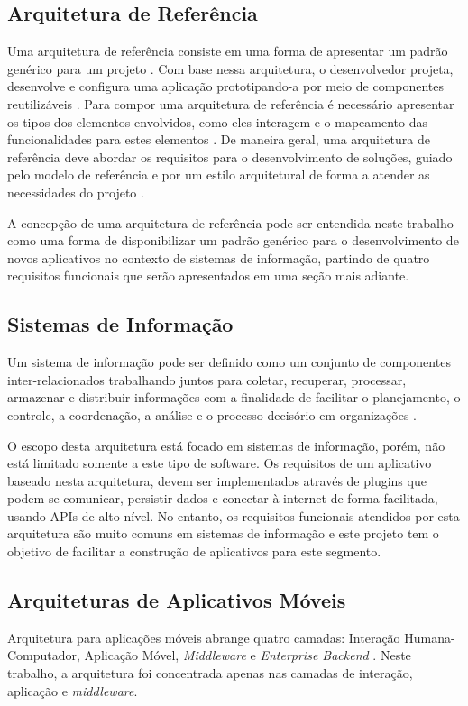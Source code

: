 \subsection{Arquitetura de Referência} %
Uma arquitetura de referência consiste em uma forma de apresentar um padrão genérico para um projeto \cite{zambiasi}. Com base nessa arquitetura, o desenvolvedor projeta, desenvolve e configura uma aplicação prototipando-a por meio de componentes reutilizáveis \cite{zambiasi}. Para compor uma arquitetura de referência é necessário apresentar os tipos dos elementos envolvidos, como eles interagem e o mapeamento das funcionalidades para estes elementos \cite{Hofmeister:1999:ASA:322640}. De maneira geral, uma arquitetura de referência deve abordar os requisitos para o desenvolvimento de soluções, guiado pelo modelo de referência e por um estilo arquitetural de forma a atender as necessidades do projeto \cite{c._k_f._2006}.\par

A concepção de uma arquitetura de referência pode ser entendida neste trabalho como uma forma de disponibilizar um padrão genérico para o desenvolvimento de novos aplicativos no contexto de sistemas de informação, partindo de quatro requisitos funcionais que serão apresentados em uma seção mais adiante.\par


\subsection{Sistemas de Informação} %
Um sistema de informação pode ser definido como um conjunto de componentes inter-relacionados trabalhando juntos para coletar, recuperar, processar, armazenar e distribuir informações com a finalidade de facilitar o planejamento, o controle, a coordenação, a análise e o processo decisório em organizações \cite{laudon}.\par
O escopo desta arquitetura está focado em sistemas de informação, porém, não está limitado somente a este tipo de software. Os requisitos de um aplicativo baseado nesta arquitetura, devem ser implementados através de plugins que podem se comunicar, persistir dados e conectar à internet de forma facilitada, usando APIs de alto nível. No entanto, os requisitos funcionais atendidos por esta arquitetura são muito comuns em sistemas de informação e este projeto tem o objetivo de facilitar a construção de aplicativos para este segmento.


\subsection{Arquiteturas de Aplicativos Móveis} %
Arquitetura para aplicações móveis abrange quatro camadas: Interação Humana-Computador, Aplicação Móvel, \textit{Middleware} e \textit{Enterprise Backend} \cite{Pabllo:2008:MMA:1621087.1621128}. Neste trabalho, a arquitetura foi concentrada apenas nas camadas de interação, aplicação e \textit{middleware}.

